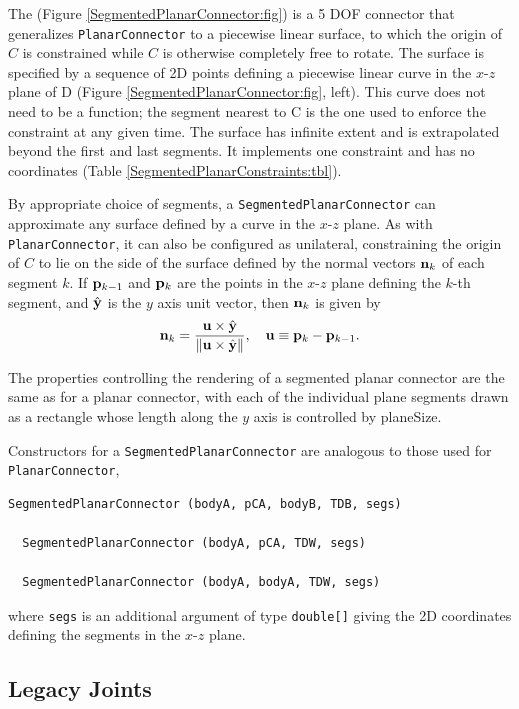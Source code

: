 The 
(Figure \ref{SegmentedPlanarConnector:fig}) is a 5 DOF connector that
generalizes {\tt PlanarConnector} to a piecewise linear surface, to
which the origin of $C$ is constrained while $C$ is otherwise
completely free to rotate. The surface is specified by a sequence of
2D points defining a piecewise linear curve in the $x$-$z$ plane of D
(Figure \ref{SegmentedPlanarConnector:fig}, left). This curve does not
need to be a function; the segment nearest to C is the one used to
enforce the constraint at any given time. The surface has infinite
extent and is extrapolated beyond the first and last segments.  It
implements one constraint and has no coordinates (Table
\ref{SegmentedPlanarConstraints:tbl}).

By appropriate choice of segments, a {\tt SegmentedPlanarConnector}
can approximate any surface defined by a curve in the $x$-$z$ plane.
As with {\tt PlanarConnector}, it can also be configured as
unilateral, constraining the origin of $C$ to lie on the side of the
surface defined by the normal vectors ${\bf n}_k$ of each segment $k$. If
${\bf p}_{k-1}$ and ${\bf p}_k$ are the points in the $x$-$z$ plane defining the
$k$-th segment, and $\hat{{\bf y}}$ is the $y$ axis unit vector, then ${\bf n}_k$
is given by
%
\begin{equation}
{\bf n}_k = \frac{{\bf u} \times \hat{{\bf y}}}{\| {\bf u} \times \hat{{\bf y}}\|},
\quad {\bf u} \equiv {\bf p}_{k} -{\bf p}_{k-1}.
\end{equation}
%

The properties controlling the rendering of a segmented planar
connector are the same as for a planar connector, with each of the
individual plane segments drawn as a rectangle whose length along the
$y$ axis is controlled by {\sf planeSize}.

Constructors for a {\tt SegmentedPlanarConnector} are analogous to
those used for {\tt PlanarConnector},
\begin{lstlisting}[]
  SegmentedPlanarConnector (bodyA, pCA, bodyB, TDB, segs)

  SegmentedPlanarConnector (bodyA, pCA, TDW, segs)

  SegmentedPlanarConnector (bodyA, bodyA, TDW, segs)
\end{lstlisting}
%
where {\tt segs} is an additional argument of type {\tt double[]}
giving the 2D coordinates defining the segments in the $x$-$z$ plane.

\subsection{Legacy Joints}

